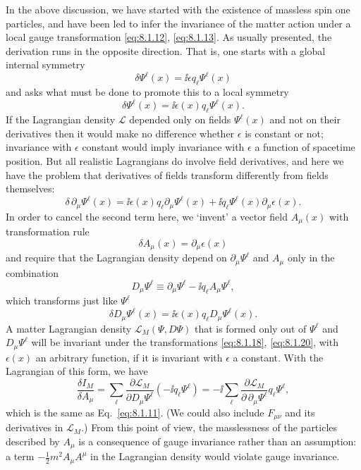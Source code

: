 In the above discussion, we have started with the existence of massless
spin one particles, and have been led to infer the invariance of the matter
action under a local gauge transformation \eqref{eq:8.1.12}, \eqref{eq:8.1.13}. As usually
presented, the derivation runs in the opposite direction. That is, one starts
with a global internal symmetry
\begin{equation}
  \delta\Psi^\ell(x)=\ii\epsilon q_\ell\Psi^\ell(x)
  \tag{8.1.17}\label{eq:8.1.17}
\end{equation}
and asks what must be done to promote this to a local symmetry
\begin{equation}
  \delta\Psi^\ell(x)=\ii\epsilon(x)q_\ell\Psi^\ell(x).
  \tag{8.1.18}\label{eq:8.1.18}
\end{equation}
If the Lagrangian density $\mathcal L$ depended only on fields $\Psi^\ell(x)$ and
not on their derivatives then it would make no difference whether $\epsilon$ is
constant or not; invariance with $\epsilon$ constant would imply invariance with
$\epsilon$ a function of spacetime position. But all realistic Lagrangians do
involve field derivatives, and here we have the problem that derivatives of
fields transform differently from fields themselves:
\begin{equation}
  \delta\,\partial_\mu\Psi^\ell(x)
  =\ii\epsilon(x)q_\ell\partial_\mu\Psi^\ell(x)
  +\ii q_\ell\Psi^\ell(x)\partial_\mu\epsilon(x).
  \tag{8.1.19}\label{eq:8.1.19}
\end{equation}
In order to cancel the second term here, we `invent' a vector field $A_\mu(x)$
with transformation rule
\begin{equation}
  \delta A_\mu(x)=\partial_\mu\epsilon(x)
  \tag{8.1.20}\label{eq:8.1.20}
\end{equation}
and require that the Lagrangian density depend on $\partial_\mu\Psi^\ell$ and
$A_\mu$ only in the combination
\begin{equation}
  D_\mu\Psi^\ell\equiv\partial_\mu\Psi^\ell-\ii q_\ell A_\mu\Psi^\ell,
  \tag{8.1.21}\label{eq:8.1.21}
\end{equation}
which transforms just like $\Psi^\ell$
\begin{equation}
  \delta D_\mu\Psi^\ell(x)=\ii\epsilon(x)q_\ell D_\mu\Psi^\ell(x).
  \tag{8.1.22}\label{eq:8.1.22}
\end{equation}
A matter Lagrangian density $\mathcal L_M(\Psi,D\Psi)$ that is formed only
out of $\Psi^\ell$ and $D_\mu\Psi^\ell$ will be invariant under the
transformations \eqref{eq:8.1.18}, \eqref{eq:8.1.20}, with $\epsilon(x)$ an arbitrary function,
if it is invariant with $\epsilon$ a constant. With the Lagrangian of this form,
we have
\[
  \frac{\delta I_M}{\delta A_\mu}
  =\sum_\ell\frac{\partial\mathcal L_M}{\partial D_\mu\Psi^\ell}
  (-\ii q_\ell\Psi^\ell)
  =-\ii\sum_\ell\frac{\partial\mathcal L_M}{\partial\,\partial_\mu\Psi^\ell}
  q_\ell\Psi^\ell,
\]
which is the same as Eq.~\eqref{eq:8.1.11}. (We could also include $F_{\mu\nu}$ and its
derivatives in $\mathcal L_M$.) From this point of view, the masslessness of the
particles described by $A_\mu$ is a consequence of gauge invariance rather
than an assumption: a term $-\tfrac12m^2A_\mu A^\mu$ in the Lagrangian density
would violate gauge invariance.
